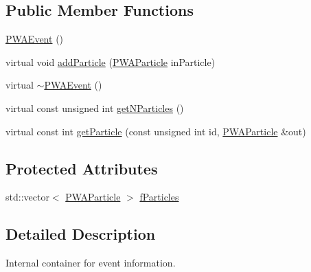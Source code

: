 \subsection*{Public Member Functions}
\begin{DoxyCompactItemize}
\item 
\hyperlink{classPWAEvent_ad3c985fe0c67d2294ff58b99fb06a043}{PWAEvent} ()
\item 
virtual void \hyperlink{classPWAEvent_a9bacf043ab4eb9bff4e7b44580292d51}{addParticle} (\hyperlink{classPWAParticle}{PWAParticle} inParticle)
\item 
virtual \hyperlink{classPWAEvent_aed26fd206a7074baca66e27b3b983e55}{$\sim$PWAEvent} ()
\item 
virtual const unsigned int \hyperlink{classPWAEvent_a49b9731f3e38c7535c14bb0df3b032fc}{getNParticles} ()
\item 
virtual const int \hyperlink{classPWAEvent_a10ce3fc05ac0f64ac411b03a4d0f0138}{getParticle} (const unsigned int id, \hyperlink{classPWAParticle}{PWAParticle} \&out)
\end{DoxyCompactItemize}
\subsection*{Protected Attributes}
\begin{DoxyCompactItemize}
\item 
std::vector$<$ \hyperlink{classPWAParticle}{PWAParticle} $>$ \hyperlink{classPWAEvent_aac928bac7991d55225c0219c4c9ddf7a}{fParticles}
\end{DoxyCompactItemize}


\subsection{Detailed Description}
Internal container for event information. 

